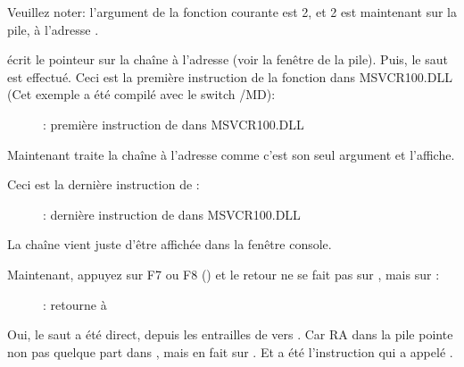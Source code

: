 Veuillez noter: l'argument de la fonction courante est 2, et 2 est maintenant
sur la pile, à l'adresse .

\clearpage
\MOV écrit le pointeur sur la chaîne à l'adresse  (voir la fenêtre de la pile).
Puis, le saut est effectué.
Ceci est la première instruction de la fonction \printf dans MSVCR100.DLL (Cet exemple
a été compilé avec le switch /MD):

\begin{figure}[H]
\centering
{}
\caption{\olly: première instruction de \printf dans MSVCR100.DLL}
\label{fig:switch_few_olly6}
\end{figure}

Maintenant \printf traite la chaîne à l'adresse  comme c'est son
seul argument et l'affiche.

\clearpage
Ceci est la dernière instruction de \printf:

\begin{figure}[H]
\centering
{}
\caption{\olly: dernière instruction de \printf dans MSVCR100.DLL}
\label{fig:switch_few_olly7}
\end{figure}

La chaîne  vient juste d'être affichée dans la fenêtre console.

\clearpage
Maintenant, appuyez sur F7 ou F8 (\stepover) et le retour ne se fait pas sur \ttf,
mais sur \main:

\begin{figure}[H]
\centering
{}
\caption{\olly: retourne à \main}
\label{fig:switch_few_olly8}
\end{figure}

Oui, le saut a été direct, depuis les entrailles de \printf vers \main.
Car \ac{RA} dans la pile pointe non pas quelque part dans \ttf, mais en fait sur
\main.
Et \CALL {} a été l'instruction qui a appelé \ttf.
